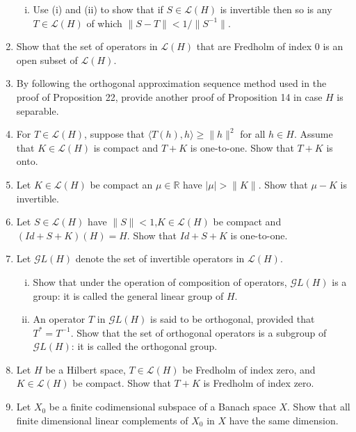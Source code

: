 \begin{enumerate}
\begin{enumerate}[(i)]
        \item Use (i) and (ii) to show that if $S\in\mathcal{L}(H)$ is invertible then so is any $T\in\mathcal{L}(H)$ of which $\|S-T\|<1/\|S^{-1}\|$.
    \end{enumerate}
    \item Show that the set of operators in $\mathcal{L}(H)$ that are Fredholm of index $0$ is an open subset of $\mathcal{L}(H)$.
    \item By following the orthogonal approximation sequence method used in the proof of Proposition 22, provide another proof of Proposition 14 in case $H$ is separable.
    \item For $T\in\mathcal{L}(H)$, suppose that $\langle T(h),h\rangle\ge\|h\|^2$ for all $h\in H$.
    Assume that $K\in\mathcal{L}(H)$ is compact and $T+K$ is one-to-one.
    Show that $T+K$ is onto.
    \item Let $K\in\mathcal{L}(H)$ be compact an $\mu\in\mathbb{R}$ have $|\mu|>\|K\|$.
    Show that $\mu- K$ is invertible.
    \item Let $S\in\mathcal{L}(H)$ have $\|S\|<1$,$K\in\mathcal{L}(H)$ be compact and $(Id+S+K)(H)=H$.
    Show that $Id+S+K$ is one-to-one.
    \item Let $\mathcal{G}L(H)$ denote the set of invertible operators in $\mathcal{L}(H)$.
    \begin{enumerate}[(i)]
        \item Show that under the operation of composition of operators, $\mathcal{G}L(H)$ is a group: it is called the general linear group of $H$.
        \item An operator $T$ in $\mathcal{G}L(H)$ is said to be orthogonal, provided that $T^*=T^{-1}$.
        Show that the set of orthogonal operators is a subgroup of $\mathcal{G}L(H)$: it is called the orthogonal group.
    \end{enumerate} 
    \item Let $H$ be a Hilbert space, $T\in\mathcal{L}(H)$ be Fredholm of index zero, and $K\in\mathcal{L}(H)$ be compact.
    Show that $T+K$ is Fredholm of index zero.
    \item Let $X_0$ be a finite codimensional subspace of a Banach space $X$.
    Show that all finite dimensional linear complements of $X_0$ in $X$ have the same dimension.
\end{enumerate}
